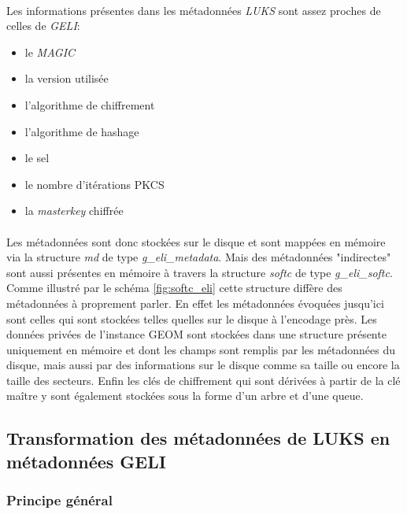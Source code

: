 \paragraph{}
Les informations présentes dans les métadonnées \textit{LUKS} sont assez proches
de celles de \textit{GELI}:
\begin{itemize}
\item le \textit{MAGIC}
\item la version utilisée
\item l'algorithme de chiffrement
\item l'algorithme de hashage
\item le sel
\item le nombre d'itérations PKCS
\item la \textit{masterkey} chiffrée
\end{itemize}

\paragraph{}
Les métadonnées sont donc stockées sur le disque et sont mappées en mémoire via
la structure {\em md} de type {\em g\_eli\_metadata}. Mais des métadonnées 
"indirectes" sont aussi présentes en mémoire à travers la structure {\em softc} 
de type {\em g\_eli\_softc}. Comme illustré par le schéma \ref{fig:softc_eli} 
cette structure diffère des 
métadonnées à proprement parler. En effet les métadonnées évoquées jusqu'ici sont
celles qui sont stockées telles quelles sur le disque à l'encodage près. Les 
données privées de l'instance GEOM sont stockées dans une structure présente 
uniquement en mémoire et dont les champs sont remplis par les métadonnées du 
disque, mais aussi par des informations sur le disque comme sa taille ou encore 
la taille des secteurs. Enfin les clés de chiffrement qui sont dérivées à partir
de la clé maître y sont également stockées sous la forme d'un arbre et d'une 
queue.

\subsection{Transformation des métadonnées de LUKS en métadonnées GELI}
\subsubsection{Principe général}
